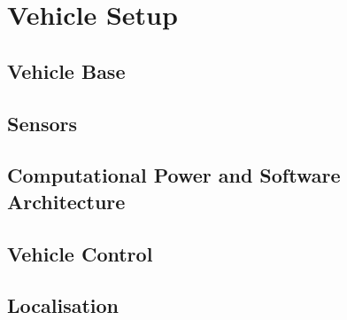 \chapter{Vehicle Setup}
\label{vehicle_info}
\section{Vehicle Base}
\section{Sensors}
\section{Computational Power and Software Architecture}
\section{Vehicle Control}
\section{Localisation}

